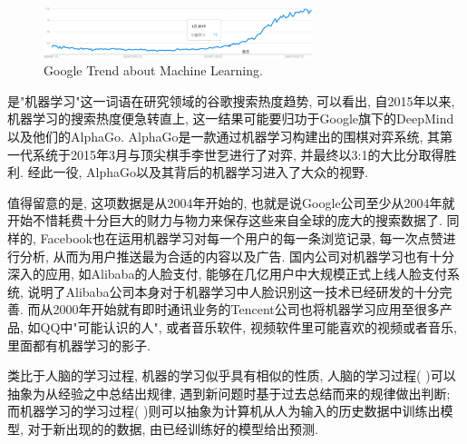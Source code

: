 \documentclass[lang=cn,11pt,a4paper]{elegantpaper}
\begin{document}
\begin{figure}[htbp]
	\centering
	\includegraphics[width=0.7\textwidth]{GoogleTrend}
  	\caption{Google Trend about Machine Learning.\label{fig:GoogleTrend}}
\end{figure}
\par {} 是"机器学习"这一词语在研究领域的谷歌搜索热度趋势\cite{GT}, 可以看出, 自2015年以来, 机器学习的搜索热度便急转直上, 这一结果可能要归功于Google旗下的DeepMind以及他们的AlphaGo. AlphaGo是一款通过机器学习构建出的围棋对弈系统, 其第一代系统于2015年3月与顶尖棋手李世乭进行了对弈, 并最终以3:1的大比分取得胜利. 经此一役, AlphaGo以及其背后的机器学习进入了大众的视野. 
\par 值得留意的是, 这项数据是从2004年开始的, 也就是说Google公司至少从2004年就开始不惜耗费十分巨大的财力与物力来保存这些来自全球的庞大的搜索数据了. 同样的, Facebook也在运用机器学习对每一个用户的每一条浏览记录, 每一次点赞进行分析, 从而为用户推送最为合适的内容以及广告. 国内公司对机器学习也有十分深入的应用, 如Alibaba的人脸支付, 能够在几亿用户中大规模正式上线人脸支付系统, 说明了Alibaba公司本身对于机器学习中人脸识别这一技术已经研发的十分完善. 而从2000年开始就有即时通讯业务的Tencent公司也将机器学习应用至很多产品, 如QQ中"可能认识的人", 或者音乐软件, 视频软件里可能喜欢的视频或者音乐, 里面都有机器学习的影子.
\par 类比于人脑的学习过程, 机器的学习似乎具有相似的性质, 人脑的学习过程( )可以抽象为从经验之中总结出规律, 遇到新问题时基于过去总结而来的规律做出判断; 而机器学习的学习过程( )则可以抽象为计算机从人为输入的历史数据中训练出模型, 对于新出现的的数据, 由已经训练好的模型给出预测. 
\end{document}

